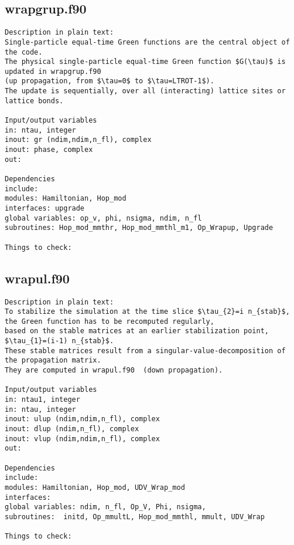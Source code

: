 \clearpage
\subsection{wrapgrup.f90}
\begin{verbatim}
Description in plain text:
Single-particle equal-time Green functions are the central object of the code. 
The physical single-particle equal-time Green function $G(\tau)$ is updated in wrapgrup.f90 
(up propagation, from $\tau=0$ to $\tau=LTROT-1$). 
The update is sequentially, over all (interacting) lattice sites or lattice bonds.

Input/output variables
in: ntau, integer
inout: gr (ndim,ndim,n_fl), complex
inout: phase, complex
out:

Dependencies
include: 
modules: Hamiltonian, Hop_mod
interfaces: upgrade
global variables: op_v, phi, nsigma, ndim, n_fl 
subroutines: Hop_mod_mmthr, Hop_mod_mmthl_m1, Op_Wrapup, Upgrade

Things to check: 
\end{verbatim}
\clearpage
\subsection{wrapul.f90}
\begin{verbatim}
Description in plain text:
To stabilize the simulation at the time slice $\tau_{2}=i n_{stab}$, 
the Green function has to be recomputed regularly, 
based on the stable matrices at an earlier stabilization point, $\tau_{1}=(i-1) n_{stab}$.
These stable matrices result from a singular-value-decomposition of the propagation matrix.
They are computed in wrapul.f90  (down propagation).

Input/output variables
in: ntau1, integer
in: ntau, integer
inout: ulup (ndim,ndim,n_fl), complex
inout: dlup (ndim,n_fl), complex
inout: vlup (ndim,ndim,n_fl), complex
out:

Dependencies
include: 
modules: Hamiltonian, Hop_mod, UDV_Wrap_mod
interfaces: 
global variables: ndim, n_fl, Op_V, Phi, nsigma, 
subroutines:  initd, Op_mmultL, Hop_mod_mmthl, mmult, UDV_Wrap

Things to check:
\end{verbatim}
\clearpage
